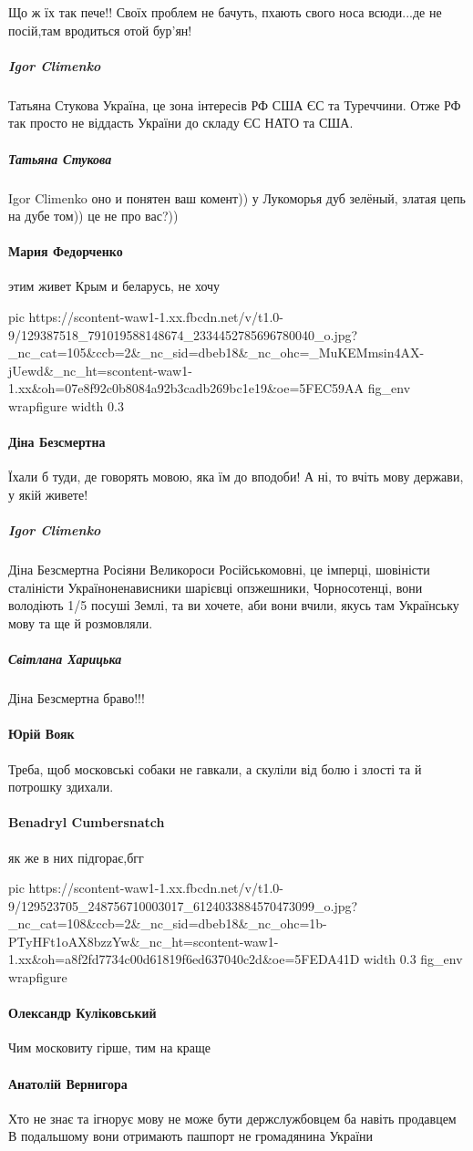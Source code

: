 Що ж їх так пече!! Своїх проблем не бачуть, пхають свого носа всюди...де не
посій,там вродиться отой бур'ян!

\subparagraph{Igor Climenko}
Татьяна Стукова Україна, це зона інтересів РФ США ЄС та Туреччини. Отже РФ так
просто не віддасть України до складу ЄС НАТО та США.

\subparagraph{Татьяна Стукова}
Igor Climenko
оно и понятен ваш комент)) у Лукоморья дуб зелёный, златая цепь на дубе том)) це
не про вас?)) 

\paragraph{Мария Федорченко}
этим живет Крым и беларусь, не хочу

\ifcmt
pic https://scontent-waw1-1.xx.fbcdn.net/v/t1.0-9/129387518_791019588148674_2334452785696780040_o.jpg?_nc_cat=105&ccb=2&_nc_sid=dbeb18&_nc_ohc=_MuKEMmsin4AX-jUewd&_nc_ht=scontent-waw1-1.xx&oh=07e8f92c0b8084a92b3cadb269bc1e19&oe=5FEC59AA
fig_env wrapfigure
width 0.3
\fi

\paragraph{Діна Безсмертна}
Їхали б туди, де говорять мовою, яка їм до вподоби! А ні, то вчіть мову
держави, у якій живете!

\subparagraph{Igor Climenko}
Діна Безсмертна Росіяни Великороси Російськомовні, це імперці, шовіністи
сталіністи Україноненависники шарієвці опзжешники, Чорносотенці, вони володіють
1/5 посуші Землі, та ви хочете, аби вони вчили, якусь там Українську мову та ще
й розмовляли.

\subparagraph{Світлана Харицька}
Діна Безсмертна
браво!!!

\paragraph{Юрій Вояк}
Треба, щоб московські собаки не гавкали, а скуліли від болю і злості та й потрошку здихали.

\paragraph{Benadryl Cumbersnatch}
як же в них підгорає,бгг

\ifcmt
pic https://scontent-waw1-1.xx.fbcdn.net/v/t1.0-9/129523705_248756710003017_6124033884570473099_o.jpg?_nc_cat=108&ccb=2&_nc_sid=dbeb18&_nc_ohc=1b-PTyHFt1oAX8bzzYw&_nc_ht=scontent-waw1-1.xx&oh=a8f2fd7734c00d61819f6ed637040c2d&oe=5FEDA41D
width 0.3
fig_env wrapfigure
\fi

\paragraph{Олександр Куліковський}
Чим московиту гірше, тим на краще

\paragraph{Анатолій Вернигора}

Хто не знає та ігнорує мову не може бути держслужбовцем ба навіть продавцем В
подальшому вони отримають пашпорт не громадянина України
